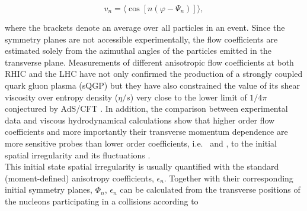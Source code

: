 
\begin{equation}
v_{n} = \langle{\cos[n(\varphi - \Psi_n)]}\rangle,
\label{Eq:vn}
\end{equation}

where the brackets denote an average over all particles in an event. Since the symmetry planes are not accessible experimentally, the flow coefficients are estimated solely from the azimuthal angles of the particles emitted in the transverse plane. Measurements of different anisotropic flow coefficients at both RHIC \cite{Adams:2003am,Abelev:2007qg,Adler:2003kt,Adare:2006ti,Alver:2007qw,Adcox:2002ms,Adamczyk:2013gw,Adler:2004cj,Afanasiev:2009wq,Adare:2011tg,Ackermann:2000tr,Adler:2001nb,Adler:2002ct,Adler:2002pu,Adams:2003zg,Adams:2004wz,Adams:2004bi} and the LHC \cite{Aamodt:2010pa, ALICE:2011ab, Abelev:2012di, Chatrchyan:2012xq, Chatrchyan:2012ta, ATLAS:2011ah, ATLAS:2012at,Abelev:2014pua,Adam:2016nfo,Adam:2016izf, Acharya:2018zuq,
Chatrchyan:2013kba, Adam:2015eta, Acharya:2018lmh,Acharya:2018ihu} have not only confirmed the production of a strongly coupled quark gluon plasma (sQGP) but they have also constrained the value of its shear viscosity over entropy density ($\eta/s$) very close to the lower limit of $1/4\pi$ conjectured by AdS/CFT \cite{Kovtun:2004de}. In addition, the comparison between experimental data \cite{Adam:2016izf} and viscous hydrodynamical calculations \cite{Niemi:2015voa} show that higher order flow coefficients and more importantly their transverse momentum dependence are more sensitive probes than lower order coefficients, i.e. \vtwo~and \vthree, to the initial spatial irregularity and its fluctuations \cite{Alver:2010dn}.\\ %
This initial state spatial irregularity is usually quantified with the standard (moment-defined) anisotropy coefficients, $\epsilon_{n}$. Together with their corresponding initial symmetry planes, $\Phi_n$,  $\epsilon_{n}$ can be calculated from the transverse positions of the nucleons participating in a collisions according to \cite{Teaney:2010vd, Alver:2010gr}

